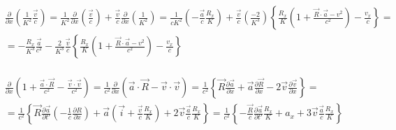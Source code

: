 \documentclass[11pt]{article}
\begin{document}
\[\begin{align}
  & \frac{\partial }{\partial x}\left( \frac{1}{{{K}^{2}}}\frac{\overrightarrow{v}}{c} \right)=\frac{1}{{{K}^{2}}}\frac{\partial }{\partial x}\left( \frac{\overrightarrow{v}}{c} \right)+\frac{\overrightarrow{v}}{c}\frac{\partial }{\partial x}\left( \frac{1}{{{K}^{2}}} \right)=\frac{1}{c{{K}^{2}}}\left( -\frac{\overrightarrow{a}}{c}\frac{{{R}_{x}}}{K} \right)+\frac{\overrightarrow{v}}{c}\left( \frac{-2}{{{K}^{3}}} \right)\left\{ \frac{{{R}_{x}}}{K}\left( 1+\frac{\overrightarrow{R}\cdot \overrightarrow{a}-{{v}^{2}}}{{{c}^{2}}} \right)-\frac{{{v}_{x}}}{c} \right\}= \\ 
 & =-\frac{{{R}_{x}}}{{{K}^{3}}}\frac{\overrightarrow{a}}{{{c}^{2}}}-\frac{2}{{{K}^{3}}}\frac{\overrightarrow{v}}{c}\left\{ \frac{{{R}_{x}}}{K}\left( 1+\frac{\overrightarrow{R}\cdot \overrightarrow{a}-{{v}^{2}}}{{{c}^{2}}} \right)-\frac{{{v}_{x}}}{c} \right\} \\ 
\end{align}\]

\[\begin{align}
  & \frac{\partial }{\partial x}\left( 1+\frac{\overrightarrow{a}\cdot \overrightarrow{R}}{{{c}^{2}}}-\frac{\overrightarrow{v}\cdot \overrightarrow{v}}{{{c}^{2}}} \right)=\frac{1}{{{c}^{2}}}\frac{\partial }{\partial x}\left( \overrightarrow{a}\cdot \overrightarrow{R}-\overrightarrow{v}\cdot \overrightarrow{v} \right)=\frac{1}{{{c}^{2}}}\left\{ \overrightarrow{R}\frac{\partial \overrightarrow{a}}{\partial x}+\overrightarrow{a}\frac{\partial \overrightarrow{R}}{\partial x}-2\overrightarrow{v}\frac{\partial \overrightarrow{v}}{\partial x} \right\}= \\ 
 & =\frac{1}{{{c}^{2}}}\left\{ \overrightarrow{R}\frac{\partial \overrightarrow{a}}{\partial t'}\left( -\frac{1}{c}\frac{\partial R}{\partial x} \right)+\overrightarrow{a}\left( \overrightarrow{i}+\frac{\overrightarrow{v}}{c}\frac{{{R}_{x}}}{K} \right)+2\overrightarrow{v}\frac{\overrightarrow{a}}{c}\frac{{{R}_{x}}}{K} \right\}=\frac{1}{{{c}^{2}}}\left\{ -\frac{\overrightarrow{R}}{c}\frac{\partial \overrightarrow{a}}{\partial t'}\frac{{{R}_{x}}}{K}+{{a}_{x}}+3\overrightarrow{v}\frac{\overrightarrow{a}}{c}\frac{{{R}_{x}}}{K} \right\} \\ 
\end{align}\]
\end{document}
